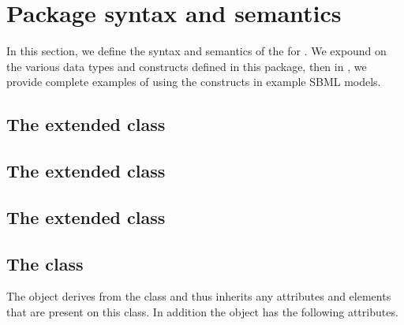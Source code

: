 \section{Package syntax and semantics}

In this section, we define the syntax and semantics of the
\RenderPackage for \sbmlthreecore. We expound on the various data types
and constructs defined in this package, then in , we
provide complete examples of using the constructs in example SBML
models.


\subsection{The extended  class}


\subsection{The extended  class}


\subsection{The extended  class}


\subsection{The  class}
\label{colordefinition-class}


The \ColorDefinition object derives from the  class and
thus inherits any attributes and elements that are present on this
class.
In addition the \ColorDefinition object has the following attributes.


